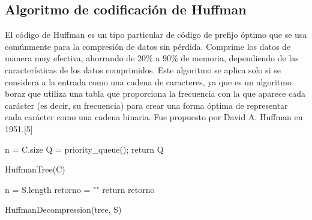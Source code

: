 \documentclass[spanish]{article}
\begin{document}
	\subsection{Algoritmo de codificación de Huffman}
		El código de Huffman es un tipo particular de código de prefijo óptimo que se usa comúnmente para la compresión de datos sin pérdida. Comprime los datos de manera muy efectiva, ahorrando de 20$\%$ a 90$\%$ de memoria, dependiendo de las características de los datos comprimidos. Este algoritmo se aplica solo si se considera a la entrada como una cadena de caracteres, ya que es un algoritmo boraz que utiliza una tabla que proporciona la frecuencia con la que aparece cada carácter (es decir, su frecuencia) para crear una forma óptima de representar cada carácter como una cadena binaria. Fue propuesto por David A. Huffman en 1951.[5]
		\begin{algorithm}[H]
			n = C.size\;
			Q = priority\_queue();
			return Q\;
			\caption{HuffmanTree(C)}
		\end{algorithm}
		\begin{algorithm}[H]
			n = S.length\;
			retorno = ""\;
			return retorno\;
			\caption{HuffmanDecompression(tree, S)}
		\end{algorithm}
\end{document}
